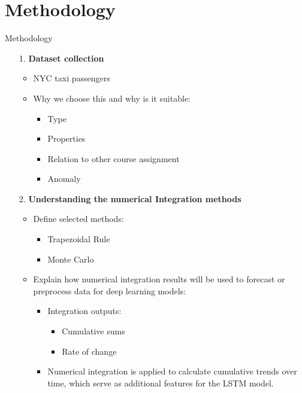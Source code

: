 \documentclass[pt]{beamer}
\newenvironment{tres important}[2][]{
	\setkeys{EmphEqEnv}{#2}
	\setkeys{EmphEqOpt}{box={\setlength{\fboxsep}{10pt}\fcolorbox{myNewColorA}{white}},#1}
	\EmphEqMainEnv}
{\endEmphEqMainEnv}
\begin{document}
\section{Methodology}

\begin{frame}{Methodology}
\begin{itemize}
    \item[1.] \textbf{Dataset collection}
    \begin{itemize}
        \item NYC taxi passengers
        \item Why we choose this and why is it suitable:
        \begin{itemize}
            \item Type
            \item Properties
            \item Relation to other course assignment
            \item Anomaly
        \end{itemize}
    \end{itemize}

    \item[2.] \textbf{Understanding the numerical Integration methods}
    \begin{itemize}
        \item Define selected methods:
        \begin{itemize}
            \item Trapezoidal Rule
            \item Monte Carlo
        \end{itemize}
        \item Explain how numerical integration results will be used to forecast or preprocess data for deep learning models:
        \begin{itemize}
            \item Integration outputs:
            \begin{itemize}
                \item Cumulative sums
                \item Rate of change
            \end{itemize}
            \item Numerical integration is applied to calculate cumulative trends over time, which serve as additional features for the LSTM model.
        \end{itemize}
    \end{itemize}
\end{itemize}
\end{frame}
\end{document}
